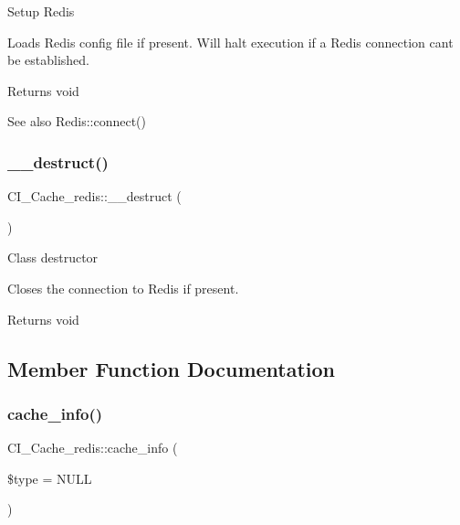 Setup Redis

Loads Redis config file if present. Will halt execution if a Redis connection can\textquotesingle{}t be established.

\begin{DoxyReturn}{Returns}
void 
\end{DoxyReturn}
\begin{DoxySeeAlso}{See also}
Redis\+::connect() 
\end{DoxySeeAlso}
\mbox{\label{class_c_i___cache__redis_a57c0ac5fd134c45c31e7b81d5d16c92d}} 
\subsubsection{\texorpdfstring{\+\_\+\+\_\+destruct()}{\_\_destruct()}}
{\footnotesize\ttfamily C\+I\+\_\+\+Cache\+\_\+redis\+::\+\_\+\+\_\+destruct (\begin{DoxyParamCaption}{ }\end{DoxyParamCaption})}

Class destructor

Closes the connection to Redis if present.

\begin{DoxyReturn}{Returns}
void 
\end{DoxyReturn}


\subsection{Member Function Documentation}
\mbox{\label{class_c_i___cache__redis_ab5f3eae8eb8c0362bfc0397889ca025c}} 
\subsubsection{\texorpdfstring{cache\+\_\+info()}{cache\_info()}}
{\footnotesize\ttfamily C\+I\+\_\+\+Cache\+\_\+redis\+::cache\+\_\+info (\begin{DoxyParamCaption}\item[{}]{\$type = {\ttfamily NULL} }\end{DoxyParamCaption})}

